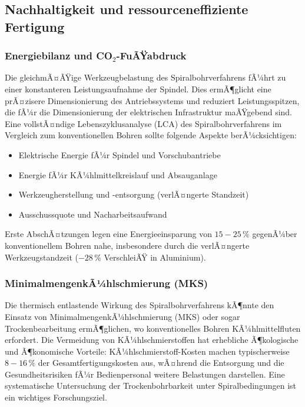 ﻿\documentclass[12pt,a4paper]{article}
\begin{document}
\subsection{Nachhaltigkeit und ressourceneffiziente Fertigung}

\subsubsection{Energiebilanz und CO$_2$-FuÃŸabdruck}

Die gleichmÃ¤ÃŸige Werkzeugbelastung des Spiralbohrverfahrens fÃ¼hrt zu einer konstanteren Leistungsaufnahme der Spindel. Dies ermÃ¶glicht eine prÃ¤zisere Dimensionierung des Antriebssystems und reduziert Leistungsspitzen, die fÃ¼r die Dimensionierung der elektrischen Infrastruktur maÃŸgebend sind. Eine vollstÃ¤ndige Lebenszyklusanalyse (LCA) des Spiralbohrverfahrens im Vergleich zum konventionellen Bohren sollte folgende Aspekte berÃ¼cksichtigen:
\begin{itemize}
    \item Elektrische Energie fÃ¼r Spindel und Vorschubantriebe
    \item Energie fÃ¼r KÃ¼hlmittelkreislauf und Absauganlage
    \item Werkzeugherstellung und -entsorgung (verlÃ¤ngerte Standzeit)
    \item Ausschussquote und Nacharbeitsaufwand
\end{itemize}
Erste AbschÃ¤tzungen legen eine Energieeinsparung von $15{-}25\,\%$ gegenÃ¼ber konventionellem Bohren nahe, insbesondere durch die verlÃ¤ngerte Werkzeugstandzeit ($-28\,\%$ VerschleiÃŸ in Aluminium).

\subsubsection{MinimalmengenkÃ¼hlschmierung (MKS)}

Die thermisch entlastende Wirkung des Spiralbohrverfahrens kÃ¶nnte den Einsatz von MinimalmengenkÃ¼hlschmierung (MKS) oder sogar Trockenbearbeitung ermÃ¶glichen, wo konventionelles Bohren KÃ¼hlmittelfluten erfordert. Die Vermeidung von KÃ¼hlschmierstoffen hat erhebliche Ã¶kologische und Ã¶konomische Vorteile: KÃ¼hlschmierstoff-Kosten machen typischerweise $8{-}16\,\%$ der Gesamtfertigungskosten aus, wÃ¤hrend die Entsorgung und die Gesundheitsrisiken fÃ¼r Bedienpersonal weitere Belastungen darstellen. Eine systematische Untersuchung der Trockenbohrbarkeit unter Spiralbedingungen ist ein wichtiges Forschungsziel.
\end{document}
